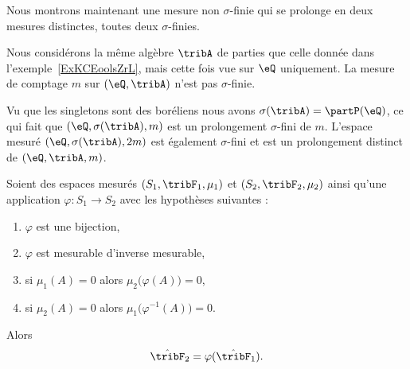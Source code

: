 
\begin{example}
    Nous montrons maintenant une mesure non \( \sigma\)-finie qui se prolonge en deux mesures distinctes, toutes deux \( \sigma\)-finies.

    Nous considérons la même algèbre \( \tribA\) de parties que celle donnée dans l'exemple~\ref{ExKCEoolsZrL}, mais cette fois vue sur \( \eQ\) uniquement. La mesure de comptage \( m\) sur \( (\eQ,\tribA)\) n'est pas \( \sigma\)-finie.

    Vu que les singletons sont des boréliens nous avons \( \sigma(\tribA)=\partP(\eQ)\), ce qui fait que \( (\eQ,\sigma(\tribA),m)\) est un prolongement \( \sigma\)-fini de \( m\). L'espace mesuré \( (\eQ,\sigma(\tribA),2m)\) est également \( \sigma\)-fini et est un prolongement distinct de \( (\eQ,\tribA,m)\).
\end{example}

\begin{proposition}     \label{PROPooORDCooJEsjzR}
    Soient des espaces mesurés \( (S_1,\tribF_1,\mu_1)\) et \( (S_2,\tribF_2, \mu_2)\) ainsi qu'une application \( \varphi\colon S_1\to S_2\) avec les hypothèses suivantes :
    \begin{enumerate}
        \item
            \( \varphi\) est une bijection,
        \item
            \( \varphi\) est mesurable d'inverse mesurable,
        \item
            si \( \mu_1(A)=0\) alors \( \mu_2\big( \varphi(A) \big)=0\),
        \item
            si \( \mu_2(A)=0\) alors \( \mu_1\big( \varphi^{-1}(A) \big)=0\).
    \end{enumerate}
    Alors
    \begin{equation}
        \hat\tribF_2=\varphi(\hat\tribF_1).
    \end{equation}
\end{proposition}

